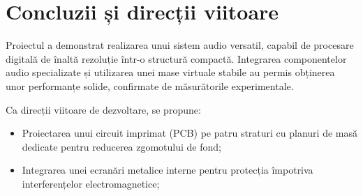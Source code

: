 \section{Concluzii și direcții viitoare}

Proiectul a demonstrat realizarea unui sistem audio versatil, capabil de procesare digitală de înaltă rezoluție într-o structură compactă. Integrarea componentelor audio specializate și utilizarea unei mase virtuale stabile au permis obținerea unor performanțe solide, confirmate de măsurătorile experimentale.

Ca direcții viitoare de dezvoltare, se propune:
\begin{itemize}
    \item Proiectarea unui circuit imprimat (PCB) pe patru straturi cu planuri de masă dedicate pentru reducerea zgomotului de fond;
    \item Integrarea unei ecranări metalice interne pentru protecția împotriva interferențelor electromagnetice;
\end{itemize}
